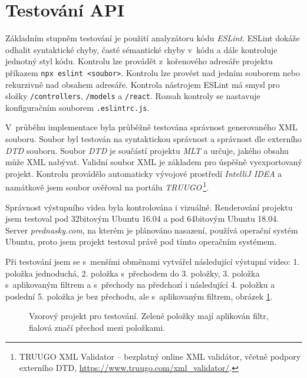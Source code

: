 \section{Testování API}
Základním stupněm testování je použití analyzátoru kódu \textit{ESLint}. ESLint dokáže odhalit syntaktické chyby, časté sémantické chyby v~kódu a dále kontroluje jednotný styl kódu. Kontrolu lze provádět z~kořenového adresáře projektu příkazem \texttt{npx eslint <soubor>}. Kontrolu lze provést nad jedním souborem nebo rekurzivně nad obsahem adresáře. Kontrola nástrojem ESLint má smysl pro složky \texttt{/controllers}, \texttt{/models} a \texttt{/react}. Rozsah kontroly se nastavuje konfiguračním souborem \texttt{.eslintrc.js}.

V~průběhu implementace byla průběžně testována správnost generovaného XML souboru. Soubor byl testován na syntaktickou správnost a správnost dle externího \textit{DTD} souboru. Soubor \textit{DTD} je součástí projektu \textit{MLT} a určuje, jakého obsahu může XML nabývat. Validní soubor XML je základem pro úspěšně vyexportovaný projekt. Kontrolu provádělo automaticky vývojové prostředí \textit{IntelliJ IDEA} a namátkově jsem soubor ověřoval na portálu \textit{TRUUGO}\,\footnote{TRUUGO XML Validator -- bezplatný online XML validátor, včetně podpory externího DTD, \url{https://www.truugo.com/xml_validator/}.}.

Správnost výstupního videa byla kontrolována i vizuálně. Renderování projektu jsem testoval pod 32bitovým Ubuntu 16.04 a pod 64bitovým Ubuntu 18.04. Server \textit{prednasky.com}, na kterém je plánováno nasazení, používá operační systém Ubuntu, proto jsem projekt testoval právě pod tímto operačním systémem.

Při testování jsem se s~menšími obměnami vytvářel následující výstupní video: 1. položka jednoduchá, 2. položka s~přechodem do 3. položky, 3. položka s~aplikovaným filtrem a s~přechody na předchozí i následující 4. položku a poslední 5. položka je bez přechodu, ale s~aplikovaným filtrem, obrázek \ref{img:testcase}.
\begin{figure}[h]
	\centering
	\caption{Vzorový projekt pro testování. Zelené položky mají aplikován filtr, fialová značí přechod mezi položkami.}\label{img:testcase}
\end{figure}


